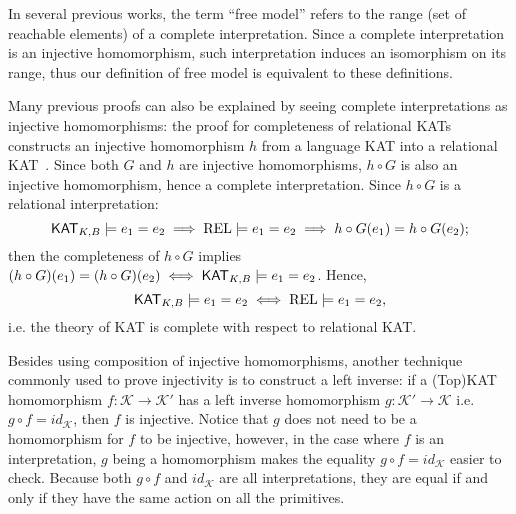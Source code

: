 In several previous works, the term ``free model'' refers to the range (set of
reachable elements) of a complete interpretation.  Since a complete
interpretation is an injective homomorphism, 
such interpretation induces an isomorphism on its range, 
thus our definition of free model is equivalent to these definitions.

Many previous proofs can also be explained by seeing complete interpretations as
injective homomorphisms: the proof for completeness of relational KATs
constructs an injective homomorphism $h$ from a language KAT into a relational
KAT~\cite{Kozen_Smith_1997}.  Since both \(G\) and \(h\) are injective
homomorphisms, \(h  \circ  G\) is also an injective homomorphism, hence a complete
interpretation.  Since \(h  \circ  G\) is a relational interpretation:
\[\mathsf{KAT}_{K, B}  \models  e_1 = e_2  \implies  \mathbf{\mathrm{REL}}  \models  e_1 = e_2  \implies  h  \circ  G(e_1) = h  \circ  G(e_2);\]
then the completeness of \(h  \circ  G\) implies
\((h  \circ  G)(e_1) = (h  \circ  G)(e_2)  \iff  \mathsf{KAT}_{K, B}  \models  e_1 = e_2\). Hence,
\[\mathsf{KAT}_{K, B}  \models  e_1 = e_2  \iff  \mathbf{\mathrm{REL}}  \models  e_1 = e_2,\]
i.e. the theory of KAT is complete with respect to relational KAT.



Besides using composition of injective homomorphisms, another technique commonly
used to prove injectivity is to construct a left inverse: 
if a (Top)KAT homomorphism \(f: \mathcal{K}  \to  \mathcal{K}'\) has a left inverse homomorphism \(g: \mathcal{K}'  \to  \mathcal{K}\) 
i.e. \(g  \circ  f = id_{\mathcal{K}}\), then \(f\) is injective.  
Notice that \(g\) does not need to be a homomorphism for \(f\) to be injective,
however, in the case where \(f\) is an interpretation, 
\(g\) being a homomorphism makes the equality \(g  \circ  f = id_{\mathcal{K}}\) easier to check.
Because both \(g  \circ  f\) and \(id_{\mathcal{K}}\) are all interpretations,
they are equal if and only if they have the same action on all the primitives.

